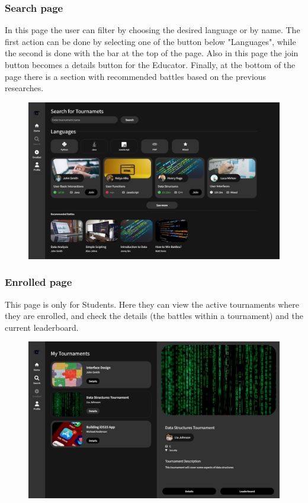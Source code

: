 \documentclass[12pt, a4paper]{report}
\begin{document}
    \subsubsection{Search page} 
    In this page the user can filter by choosing the desired language or by name. 
    The first action can be done by selecting one of the button below "Languages", while the second is done with the bar at the top of the page. 
    Also in this page the join button becomes a details button for the Educator. 
    Finally, at the bottom of the page there is a section with recommended battles based on the previous researches.
    \begin{figure}[H]
        \centering
        \includegraphics[width=0.8\linewidth]{images/search.png}
    \end{figure}

    \subsubsection{Enrolled page} 
    This page is only for Students. 
    Here they can view the active tournaments where they are enrolled, and check the details (the battles within a tournament) and the current leaderboard.
    \begin{figure}[H]
        \centering
        \includegraphics[width=0.8\linewidth]{images/enrolled.png}
    \end{figure}
\end{document}
